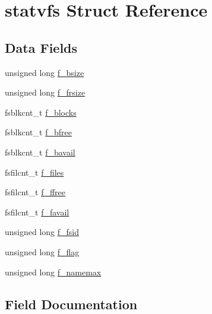 \hypertarget{structstatvfs}{}\section{statvfs Struct Reference}
\label{structstatvfs}
\subsection*{Data Fields}
\begin{DoxyCompactItemize}
\item 
unsigned long \mbox{\hyperlink{structstatvfs_a3400d89a2627d6313da0cb39ff6209ec}{f\+\_\+bsize}}
\item 
unsigned long \mbox{\hyperlink{structstatvfs_af01dafa58ce2f665bc8b6ba1741f1896}{f\+\_\+frsize}}
\item 
fsblkcnt\+\_\+t \mbox{\hyperlink{structstatvfs_a83b2d1725a43fef463597eda75b7af1b}{f\+\_\+blocks}}
\item 
fsblkcnt\+\_\+t \mbox{\hyperlink{structstatvfs_ab004873a74b951610b969a222116dccb}{f\+\_\+bfree}}
\item 
fsblkcnt\+\_\+t \mbox{\hyperlink{structstatvfs_a38e0b0109797e233de83ff9e8c4d0520}{f\+\_\+bavail}}
\item 
fsfilcnt\+\_\+t \mbox{\hyperlink{structstatvfs_a38f6a9335cabe3bff82c2d96cc538e6f}{f\+\_\+files}}
\item 
fsfilcnt\+\_\+t \mbox{\hyperlink{structstatvfs_a601437cadd9c607cba0c653706af3d22}{f\+\_\+ffree}}
\item 
fsfilcnt\+\_\+t \mbox{\hyperlink{structstatvfs_a6f336f60b6cba33b9380181ef413022f}{f\+\_\+favail}}
\item 
unsigned long \mbox{\hyperlink{structstatvfs_a1a180e536ad58f06b0c05d913d0ae9cf}{f\+\_\+fsid}}
\item 
unsigned long \mbox{\hyperlink{structstatvfs_adb8f52b3e1b3a90358ec3e97e56aafcd}{f\+\_\+flag}}
\item 
unsigned long \mbox{\hyperlink{structstatvfs_a138cd6cae031d89d7ae90649fb667696}{f\+\_\+namemax}}
\end{DoxyCompactItemize}


\subsection{Field Documentation}
\mbox{\label{structstatvfs_a38e0b0109797e233de83ff9e8c4d0520}} 

